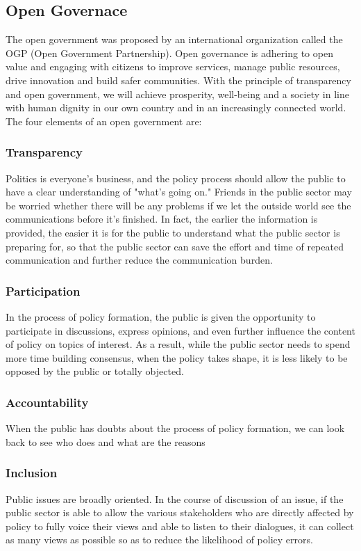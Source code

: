 \documentclass{IEEEtran}
\begin{document}
\subsection{Open Governace} 
The open government was proposed by an international organization called the OGP (Open Government Partnership). 
Open governance is adhering to open value and engaging with citizens to improve services, manage public resources, drive innovation and build safer communities. With the principle of transparency and open government, we will achieve prosperity, well-being and a society in line with human dignity in our own country and in an increasingly connected world.
The four elements of an open government are:
\subsubsection{Transparency}
Politics is everyone's business, and the policy process should allow the public to have a clear understanding of "what's going on." Friends in the public sector may be worried whether there will be any problems if we let the outside world see the communications before it's finished. In fact, the earlier the information is provided, the easier it is for the public to understand what the public sector is preparing for, so that the public sector can save the effort and time of repeated communication and further reduce the communication burden. 
\subsubsection{Participation}
In the process of policy formation, the public is given the opportunity to participate in discussions, express opinions, and even further influence the content of policy on topics of interest. As a result, while the public sector needs to spend more time building consensus, when the policy takes shape, it is less likely to be opposed by the public or totally objected.  
\subsubsection{Accountability}
When the public has doubts about the process of policy formation, we can look back to see who does and what are the reasons   
\subsubsection{Inclusion}
Public issues are broadly oriented. In the course of discussion of an issue, if the public sector is able to allow the various stakeholders who are directly affected by policy to fully voice their views and able to listen to their dialogues, it can collect as many views as possible so as to reduce the likelihood of policy errors. 
\end{document}
